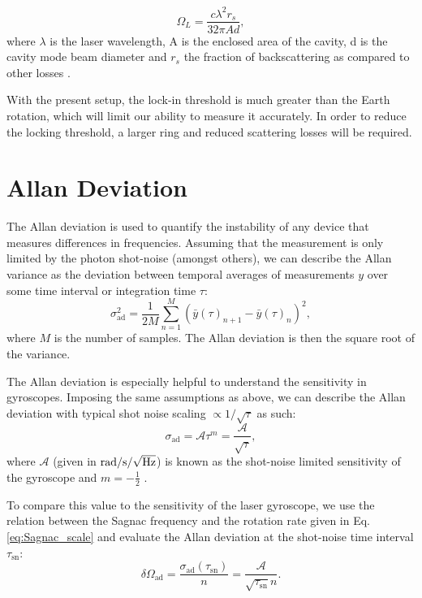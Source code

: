 \documentclass[a4paper]{report}
\numberwithin{equation}{section}
\begin{document}
\begin{equation}
		\Omega_{L} = \frac{c \lambda^2 r_{s}}{32 \pi  A d},
		\label{eq:lockin_thresh}
\end{equation}
where $\lambda$ is the laser wavelength, A is the enclosed area of the cavity, d is the cavity mode beam diameter and $r_{s}$ the fraction of backscattering as compared to other losses \cite{Liu}.

With the present setup, the lock-in threshold is much greater than the Earth rotation, which will limit our ability to measure it accurately. In order to reduce the locking threshold, a larger ring and reduced scattering losses will be required. 

\section{Allan Deviation} \label{sec:allan_dev}

The Allan deviation is used to quantify the instability of any device that measures differences in frequencies. Assuming that the
measurement is only limited by the photon shot-noise (amongst others), we can describe the Allan variance as the deviation
between temporal averages of measurements $y$ over some time interval or integration time $\tau$:
\begin{equation}
	\sigma_{{\text{ad}}}^2 = \frac{1}{2M} \sum\limits_{n=1}^M (\bar{y}(\tau)_{n+1} - \bar{y}(\tau)_n)^2,
	\label{eq:allan_def}
\end{equation}
where $M$ is the number of samples. The Allan deviation is then the square root of the variance. \par 

The Allan deviation is especially helpful to understand the sensitivity in gyroscopes. Imposing the same assumptions as above,
we can describe the Allan deviation with typical shot noise scaling $\propto 1 / \sqrt{\tau}$ as such:
\begin{equation}
	\sigma_{\text{ad}} = \mathcal{A} \tau ^ m = \frac{\mathcal{A}}{\sqrt{\tau}},
	\label{eq:allan_shotnoise}
\end{equation}
where $\mathcal{A}$ (given in $\si{\radian\per\second\per\sqrt{\hertz}}$) is known as the shot-noise limited sensitivity of the gyroscope and $m = -\frac{1}{2}$ \cite{Groh2021}. \par 

To compare this value to the sensitivity of the laser gyroscope, we use the relation between the Sagnac frequency and the 
rotation rate given in Eq. \ref{eq:Sagnac_scale} and evaluate the Allan deviation at the shot-noise time interval $\tau_{\mathrm{sn}}$:
\begin{equation}
	\delta \Omega_{\mathrm{ad}} = \frac{\sigma_{\text{ad}} (\tau_{\mathrm{sn}})}{n} = \frac{\mathcal{A}}{\sqrt{\tau_{\mathrm{sn}}}n} . 
	\label{eq:allan_sensitivity}
\end{equation}
\end{document}
